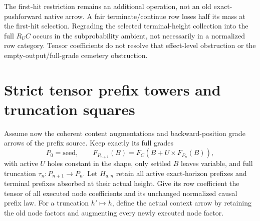 \documentclass[11pt]{article}
\begin{document}
The first-hit restriction remains an additional operation, not an old exact-pushforward native arrow. A fair terminate/continue row loses half its mass at the first-hit selection. Regrading the selected terminal-height collection into the full $R_UC$ occurs in the subprobability ambient, not necessarily in a normalized row category. Tensor coefficients do not resolve that effect-level obstruction or the empty-output/full-grade cemetery obstruction.

\section{Strict tensor prefix towers and truncation squares}
Assume now the coherent content augmentations and backward-position grade arrows of the prefix source. Keep exactly its full grades
\[
 P_0=\mathrm{seed},\qquad F_{P_{n+1}}(B)=F_C(B+U\times F_{P_n}(B)),
\]
with active $U$ holes constant in the shape, only settled $B$ leaves variable, and full truncation $\tau_n:P_{n+1}\to P_n$. Let $H_{a,n}$ retain all active exact-horizon prefixes and terminal prefixes absorbed at their actual height. Give its row coefficient the tensor of all executed node coefficients and its unchanged normalized causal prefix law. For a truncation $h'\mapsto h$, define the actual context arrow by retaining the old node factors and augmenting every newly executed node factor.
\end{document}
